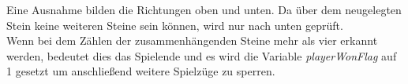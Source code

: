         Eine Ausnahme bilden die Richtungen oben und unten.
        Da über dem neugelegten Stein keine weiteren Steine sein können, wird nur nach unten geprüft.
        \\
        Wenn bei dem Zählen der zusammenhängenden Steine mehr als vier erkannt werden,
        bedeutet dies das Spielende und es wird die Variable \textit{playerWonFlag} auf 1 gesetzt um anschließend weitere Spielzüge zu sperren.

      